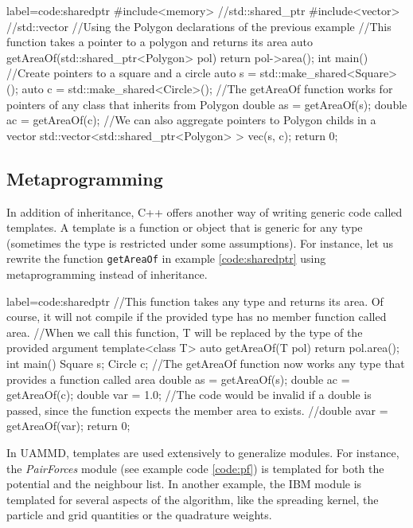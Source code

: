 \documentclass[ twoside,openright,titlepage,numbers=noenddot,%
headinclude,footinclude,cleardoublepage=empty,abstract=on,
BCOR=5mm,paper=a4,fontsize=11pt, dvipsnames
]{scrreprt}
\def\ucpp{uammd_cpp_lexer.py:UAMMDCppLexer -x}
\newcommand{\uammd}{\gls{UAMMD}\xspace}
\begin{document}
\begin{code2} {label=code:sharedptr}
  #include<memory> //std::shared_ptr
  #include<vector> //std::vector
  //Using the Polygon declarations of the previous example
  //This function takes a pointer to a polygon and returns its area
  auto getAreaOf(std::shared_ptr<Polygon> pol){
    return pol->area();
  }
  int main(){
    //Create pointers to a square and a circle
    auto s = std::make_shared<Square>();
    auto c = std::make_shared<Circle>();
    //The getAreaOf function works for pointers of any class that inherits from Polygon
    double as = getAreaOf(s);
    double ac = getAreaOf(c);
    //We can also aggregate pointers to Polygon childs in a vector
    std::vector<std::shared_ptr<Polygon> > vec({s, c});
    return 0;  
  }
\end{code2}

\subsection*{Metaprogramming}
In addition of inheritance, C++ offers another way of writing generic code called templates. A template is a function or object that is generic for any type (sometimes the type is restricted under some assumptions). For instance, let us rewrite the function \texttt{getAreaOf} in example \ref{code:sharedptr} using metaprogramming instead of inheritance.

\begin{code2} {label=code:sharedptr}
  //This function takes any type and returns its area. Of course, it will not compile if the provided type has no member function called area.
  //When we call this function, T will be replaced by the type of the provided argument
  template<class T>
  auto getAreaOf(T pol){
    return pol.area();
  }
  int main(){
    Square s;
    Circle c;
    //The getAreaOf function now works any type that provides a function called area
    double as = getAreaOf(s);
    double ac = getAreaOf(c);    
    double var = 1.0;
    //The code would be invalid if a double is passed, since the function expects the member area to exists.
    //double avar = getAreaOf(var);
    return 0;  
  }
\end{code2}

In \uammd, templates are used extensively to generalize modules. For instance, the \emph{PairForces} module (see example code \ref{code:pf}) is templated for both the potential and the neighbour list. In another example, the \gls{IBM} module is templated for several aspects of the algorithm, like the spreading kernel, the particle and grid quantities or the quadrature weights.
\end{document}
